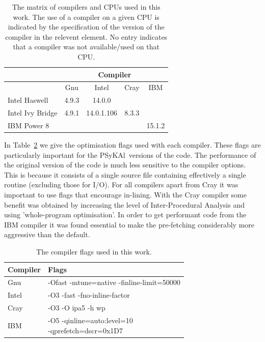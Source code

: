 \documentclass{IOS-Book-Article}
\newcommand{\psykal}{{PS}y{KA}l\ }
\begin{document}
\begin{table}[!t]
\renewcommand{\arraystretch}{1.3}
\caption{The matrix of compilers and CPUs used in this work. The use
  of a compiler on a given CPU is indicated by the specification of
  the version of the compiler in the relevent element. No entry
  indicates that a compiler was not available/used on that CPU.}
\label{TABLE_compilers}
\centering
\begin{tabular}{|l|c|c|c|c|}
\hline
                 & \multicolumn{4}{c|}{Compiler}             \\
\hline
                 & Gnu   & Intel       & Cray    & IBM     \\
\hline
Intel Haswell    & 4.9.3 & 14.0.0      &         &          \\
Intel Ivy Bridge & 4.9.1 & 14.0.1.106  & 8.3.3   &          \\
IBM Power 8      &       &             &         & 15.1.2     \\
\hline
\end{tabular}
\end{table}

In Table~\ref{TABLE_compiler_flags} we give the optimisation flags
used with each compiler. These flags are particularly important for
the \psykal versions of the code. The performance of the original
version of the code is much less sensitive to the compiler
options. This is because it consists of a single source file
containing effectively a single routine (excluding those for I/O).
For all compilers apart from Cray it was important to use flags that
encourage in-lining. With the Cray compiler some benefit was obtained
by increasing the level of Inter-Procedural Analysis and using
'whole-program optimisation'. In order to get performant code from the
IBM compiler it was found essential to make the pre-fetching
considerably more aggressive than the default.
 
\begin{table}[!t]
\renewcommand{\arraystretch}{1.3}
\caption{The compiler flags used in this work.}
\label{TABLE_compiler_flags}
\centering
\begin{tabular}{l|l}
\hline
Compiler  &  Flags \\
\hline
Gnu       & -Ofast -mtune=native -finline-limit=50000    \\
Intel     & -O3 -fast -fno-inline-factor    \\
Cray      & -O3 -O ipa5 -h wp               \\
IBM       & \parbox{5cm}{-O5 -qinline=auto:level=10\\ -qprefetch=dscr=0x1D7} \\
\hline
\end{tabular}
\end{table}
\end{document}
